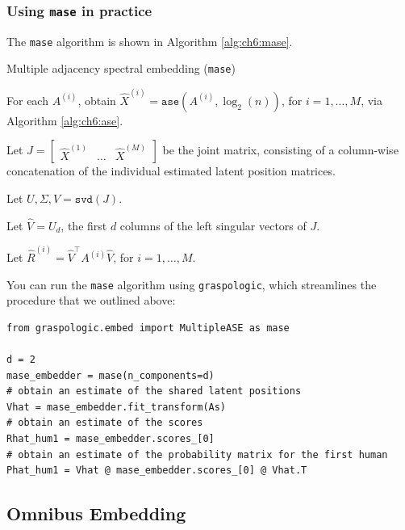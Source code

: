 \subsubsection{Using \texttt{mase} in practice}

The \texttt{mase} algorithm is shown in Algorithm \ref{alg:ch6:mase}. 

\begin{algorithm}[h]\caption{Multiple adjacency spectral embedding (\texttt{mase})}
\label{alg:ch6:mase}
\SetAlgoLined

For each $A^{(i)}$, obtain $\hat X^{(i)} = \texttt{ase}\left(A^{(i)}, \log_2(n)\right)$, for $i = 1, \hdots, M$, via Algorithm \ref{alg:ch6:ase}. 

Let $J = \begin{bmatrix}\hat X^{(1)} & \hdots & \hat X^{(M)}\end{bmatrix}$ be the joint matrix, consisting of a column-wise concatenation of the individual estimated latent position matrices.

Let $U, \Sigma, V = \texttt{svd}(J)$.

Let $\hat V = U_d$, the first $d$ columns of the left singular vectors of $J$. 

Let $\hat R^{(i)} = \hat V^\top A^{(i)}\hat V$, for $i = 1, \hdots, M$.

\end{algorithm}

You can run the \texttt{mase} algorithm using \texttt{graspologic}, which streamlines the procedure that we outlined above:

\begin{lstlisting}[style=python]
from graspologic.embed import MultipleASE as mase

d = 2
mase_embedder = mase(n_components=d)
# obtain an estimate of the shared latent positions
Vhat = mase_embedder.fit_transform(As)
# obtain an estimate of the scores
Rhat_hum1 = mase_embedder.scores_[0]
# obtain an estimate of the probability matrix for the first human
Phat_hum1 = Vhat @ mase_embedder.scores_[0] @ Vhat.T
\end{lstlisting}

\subsection{Omnibus Embedding}
\label{sec:ch6:multinet:omni}

